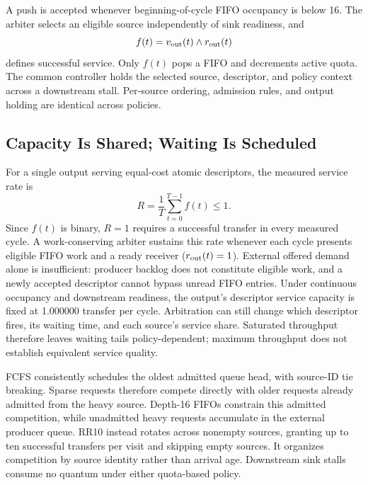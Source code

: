 

A push is accepted whenever beginning-of-cycle FIFO occupancy is below 16.
The arbiter selects an eligible source independently of sink readiness, and
\begin{equation}
 f(t)=v_{\rm out}(t)\land r_{\rm out}(t)
 \label{eq:fire}
\end{equation}
defines successful service. Only $f(t)$ pops a FIFO and decrements active quota. The common
controller holds the selected source, descriptor, and policy context across a
downstream stall. Per-source ordering, admission rules, and output holding are
identical across policies.

\subsection{Capacity Is Shared; Waiting Is Scheduled}
For a single output serving equal-cost atomic descriptors, the measured service rate is
\begin{equation}
 R=\frac{1}{T}\sum_{t=0}^{T-1}f(t)\leq 1.
 \label{eq:capacity}
\end{equation}
Since $f(t)$ is binary, $R=1$ requires a successful transfer in every measured
cycle. A work-conserving arbiter sustains this rate whenever each cycle
presents eligible FIFO work and a ready receiver ($r_{\rm out}(t)=1$). External
offered demand alone is insufficient: producer backlog does not constitute eligible work,
and a newly accepted descriptor cannot bypass unread FIFO entries. Under continuous occupancy
and downstream readiness, the output's descriptor service capacity is fixed at 1.000000 transfer
per cycle. Arbitration can still change which descriptor fires, its waiting time, and
each source's service share. Saturated throughput therefore leaves waiting
tails policy-dependent; maximum throughput does not establish equivalent service quality.

FCFS consistently schedules the oldest admitted queue head, with source-ID tie breaking. Sparse
requests therefore compete directly with older requests already admitted from the heavy
source. Depth-16 FIFOs constrain this admitted competition, while unadmitted
heavy requests accumulate in the external producer queue. RR10 instead rotates across
nonempty sources, granting up to ten successful transfers per visit and skipping
empty sources. It organizes competition by source identity rather than arrival
age. Downstream sink stalls consume no quantum under either quota-based policy.

